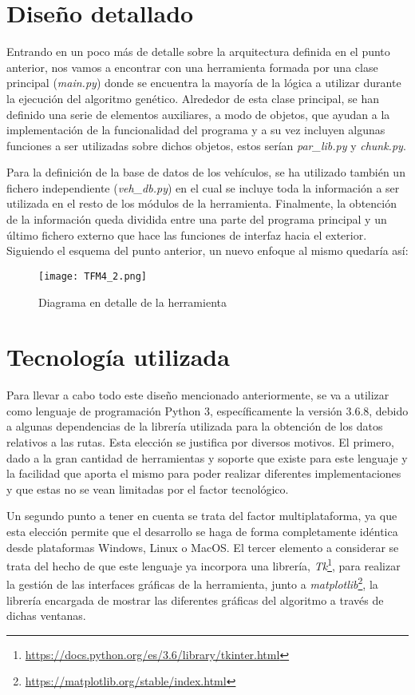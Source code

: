 \documentclass[11pt,spanish,listoffigures,listoftables]{tfgetsinf}
\begin{document}
\section{Diseño detallado}
Entrando en un poco más de detalle sobre la arquitectura definida en el punto anterior, nos vamos a encontrar con una herramienta formada por una clase principal (\textit{main.py}) donde se encuentra la mayoría de la lógica a utilizar durante la ejecución del algoritmo genético. Alrededor de esta clase principal, se han definido una serie de elementos auxiliares, a modo de objetos, que ayudan a la implementación de la funcionalidad del programa y a su vez incluyen algunas funciones a ser utilizadas sobre dichos objetos, estos serían \textit{par\_lib.py} y \textit{chunk.py}.

Para la definición de la base de datos de los vehículos, se ha utilizado también un fichero independiente (\textit{veh\_db.py}) en el cual se incluye toda la información a ser utilizada en el resto de los módulos de la herramienta. Finalmente, la obtención de la información queda dividida entre una parte del programa principal y un último fichero externo que hace las funciones de interfaz hacia el exterior. Siguiendo el esquema del punto anterior, un nuevo enfoque al mismo quedaría así:

\begin{figure}[!htb]
    \centering
    \texttt{[image: TFM4\_2.png]}    
    \caption{Diagrama en detalle de la herramienta}
    \label{fig:tool_diagram_adv}
\end{figure}

\section{Tecnología utilizada}
Para llevar a cabo todo este diseño mencionado anteriormente, se va a utilizar como lenguaje de programación Python 3, específicamente la versión 3.6.8, debido a algunas dependencias de la librería utilizada para la obtención de los datos relativos a las rutas. Esta elección se justifica por diversos motivos. El primero, dado a la gran cantidad de herramientas y soporte que existe para este lenguaje y la facilidad que aporta el mismo para poder realizar diferentes implementaciones y que estas no se vean limitadas por el factor tecnológico.

Un segundo punto a tener en cuenta se trata del factor multiplataforma, ya que esta elección permite que el desarrollo se haga de forma completamente idéntica desde plataformas Windows, Linux o MacOS. El tercer elemento a considerar se trata del hecho de que este lenguaje ya incorpora una librería, \textit{Tk}\footnote{\url{https://docs.python.org/es/3.6/library/tkinter.html}}, para realizar la gestión de las interfaces gráficas de la herramienta, junto a \textit{matplotlib}\footnote{\url{https://matplotlib.org/stable/index.html}}, la librería encargada de mostrar las diferentes gráficas del algoritmo a través de dichas ventanas.
\end{document}
